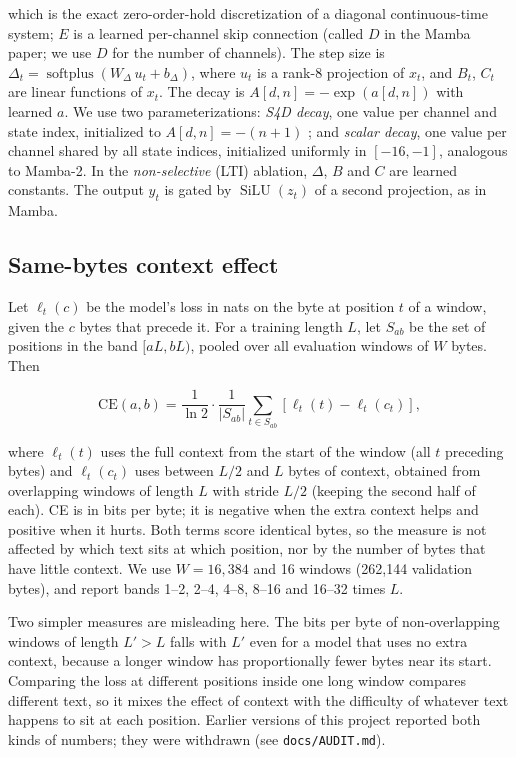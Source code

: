 \documentclass[11pt]{article}
\begin{document}
which is the exact zero-order-hold discretization of a diagonal continuous-time system; $E$ is a learned per-channel skip connection (called $D$ in the Mamba paper; we use $D$ for the number of channels). The step size is $\Delta_t = \operatorname{softplus}(W_\Delta\, u_t + b_\Delta)$, where $u_t$ is a rank-8 projection of $x_t$, and $B_t$, $C_t$ are linear functions of $x_t$. The decay is $A[d,n] = -\exp(a[d,n])$ with learned $a$. We use two parameterizations: \emph{S4D decay}, one value per channel and state index, initialized to $A[d,n] = -(n+1)$ \citep{gu2022s4d}; and \emph{scalar decay}, one value per channel shared by all state indices, initialized uniformly in $[-16,-1]$, analogous to Mamba-2. In the \emph{non-selective} (LTI) ablation, $\Delta$, $B$ and $C$ are learned constants. The output $y_t$ is gated by $\operatorname{SiLU}(z_t)$ of a second projection, as in Mamba.

\subsection{Same-bytes context effect}\label{sec:ce}

Let $\ell_t(c)$ be the model's loss in nats on the byte at position $t$ of a window, given the $c$ bytes that precede it. For a training length $L$, let $S_{ab}$ be the set of positions in the band $[aL, bL)$, pooled over all evaluation windows of $W$ bytes. Then

\begin{equation}\label{eq:ce}
\mathrm{CE}(a,b) = \frac{1}{\ln 2}\cdot\frac{1}{|S_{ab}|}\sum_{t \in S_{ab}} \left[\ell_t(t) - \ell_t(c_t)\right],
\end{equation}

where $\ell_t(t)$ uses the full context from the start of the window (all $t$ preceding bytes) and $\ell_t(c_t)$ uses between $L/2$ and $L$ bytes of context, obtained from overlapping windows of length $L$ with stride $L/2$ (keeping the second half of each). CE is in bits per byte; it is negative when the extra context helps and positive when it hurts. Both terms score identical bytes, so the measure is not affected by which text sits at which position, nor by the number of bytes that have little context. We use $W = 16{,}384$ and 16 windows (262,144 validation bytes), and report bands 1--2, 2--4, 4--8, 8--16 and 16--32 times $L$.

Two simpler measures are misleading here. The bits per byte of non-overlapping windows of length $L' > L$ falls with $L'$ even for a model that uses no extra context, because a longer window has proportionally fewer bytes near its start. Comparing the loss at different positions inside one long window compares different text, so it mixes the effect of context with the difficulty of whatever text happens to sit at each position. Earlier versions of this project reported both kinds of numbers; they were withdrawn (see \texttt{docs/AUDIT.md}).
\end{document}
